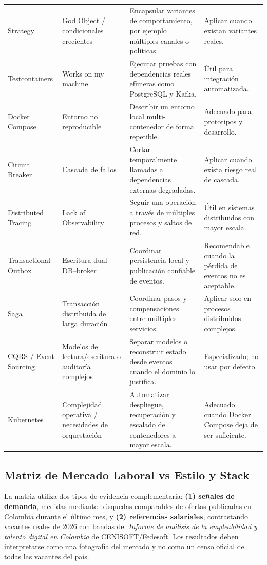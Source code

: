 \documentclass[12pt,a4paper]{article}
\begin{document}
\begin{longtable}{P{0.18\textwidth} P{0.20\textwidth} P{0.34\textwidth} P{0.17\textwidth}}
Strategy & God Object / condicionales crecientes & Encapsular variantes de comportamiento, por ejemplo múltiples canales o políticas. & Aplicar cuando existan variantes reales. \\
Testcontainers & Works on my machine & Ejecutar pruebas con dependencias reales efímeras como PostgreSQL y Kafka. & Útil para integración automatizada. \\
Docker Compose & Entorno no reproducible & Describir un entorno local multi-contenedor de forma repetible. & Adecuado para prototipos y desarrollo. \\
Circuit Breaker & Cascada de fallos & Cortar temporalmente llamadas a dependencias externas degradadas. & Aplicar cuando exista riesgo real de cascada. \\
Distributed Tracing & Lack of Observability & Seguir una operación a través de múltiples procesos y saltos de red. & Útil en sistemas distribuidos con mayor escala. \\
Transactional Outbox & Escritura dual DB--broker & Coordinar persistencia local y publicación confiable de eventos. & Recomendable cuando la pérdida de eventos no es aceptable. \\
Saga & Transacción distribuida de larga duración & Coordinar pasos y compensaciones entre múltiples servicios. & Aplicar solo en procesos distribuidos complejos. \\
CQRS / Event Sourcing & Modelos de lectura/escritura o auditoría complejos & Separar modelos o reconstruir estado desde eventos cuando el dominio lo justifica. & Especializado; no usar por defecto. \\
Kubernetes & Complejidad operativa / necesidades de orquestación & Automatizar despliegue, recuperación y escalado de contenedores a mayor escala. & Adecuado cuando Docker Compose deja de ser suficiente. \\
\bottomrule
\end{longtable}
\setlength{\tabcolsep}{6pt}
\normalsize

\subsection{Matriz de Mercado Laboral vs Estilo y Stack}

La matriz utiliza dos tipos de evidencia complementaria: \textbf{(1) señales de demanda}, medidas mediante búsquedas comparables de ofertas publicadas en Colombia durante el último mes, y \textbf{(2) referencias salariales}, contrastando vacantes reales de 2026 con bandas del \textit{Informe de análisis de la empleabilidad y talento digital en Colombia} de CENISOFT/Fedesoft. Los resultados deben interpretarse como una fotografía del mercado y no como un censo oficial de todas las vacantes del país.
\end{document}
